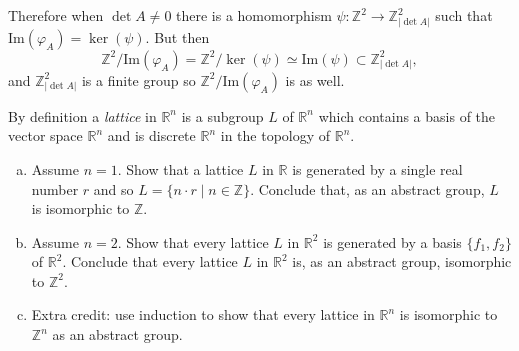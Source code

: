 \documentclass{article}
\newcounter{Problem}
\newenvironment{Problem}{\begin{Exercise}[name={Problem},
                                          counter={Problem}]}
                        {\end{Exercise}}
\begin{document}
\begin{Answer}
\begin{enumerate}[(a)]
{    Therefore when $\det A \neq 0$ there is a homomorphism
    $\psi : \mathbb{Z}^2 \to \mathbb{Z}_{|\det A|}^2$ such that
    $\mathrm{Im}(\varphi_A) = \ker(\psi)$. But then
    $$
    \mathbb{Z}^2 / \mathrm{Im}(\varphi_A) =
    \mathbb{Z}^2 / \ker(\psi) \simeq
    \mathrm{Im}(\psi) \subset \mathbb{Z}_{|\det A|}^2,
    $$
    and $\mathbb{Z}_{|\det A|}^2$ is a finite group so
    $\mathbb{Z}^2 / \mathrm{Im}(\varphi_A)$ is as well.
  }
\end{enumerate}
\end{Answer}

\pagebreak

\begin{Problem}
By definition a \emph{lattice} in $\mathbb{R}^n$ is a subgroup $L$ of
$\mathbb{R}^n$ which contains a basis of the vector space
$\mathbb{R}^n$ and is discrete
$\mathbb{R}^n$ in the topology of $\mathbb{R}^n$.
\begin{enumerate}[(a)]
  \item{
    Assume $n = 1$. Show that a lattice $L$ in $\mathbb{R}$ is
    generated by a single real number $r$ and so
    $L = \{ n \cdot r \mid n \in \mathbb{Z} \}$. Conclude that, as an
    abstract group, $L$ is isomorphic to $\mathbb{Z}$.
  }
  \item{
    Assume $n = 2$. Show that every lattice $L$ in $\mathbb{R}^2$ is
    generated by a basis $\{f_1, f_2\}$ of $\mathbb{R}^2$. Conclude
    that every lattice $L$ in $\mathbb{R}^2$ is, as an abstract group,
    isomorphic to $\mathbb{Z}^2$.
  }
  \item{
    Extra credit: use induction to show that every lattice in
    $\mathbb{R}^n$ is isomorphic to $\mathbb{Z}^n$ as an abstract group.
  }
\end{enumerate}
\end{Problem}
\end{document}
